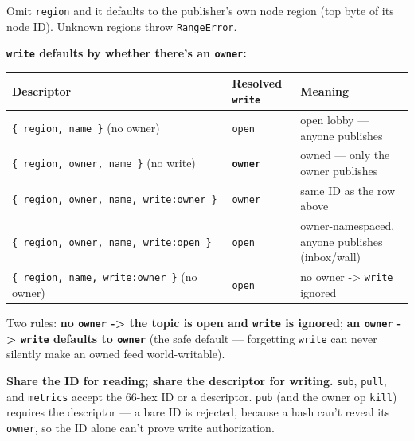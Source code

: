 \documentclass[
  nobib]{tufte-handout}
\newcounter{none} %
\begin{document}
Omit \texttt{region} and it defaults to the publisher's own node region
(top byte of its node ID). Unknown regions throw \texttt{RangeError}.

\textbf{\texttt{write} defaults by whether there's an \texttt{owner}:}

{\def\LTcaptype{none} %
\begin{longtable}[]{@{}
  >{\raggedright\arraybackslash}p{}
  >{\raggedright\arraybackslash}p{}
  >{\raggedright\arraybackslash}p{}@{}}
\toprule\noalign{}
\begin{minipage}[b]{\linewidth}\raggedright
Descriptor
\end{minipage} & \begin{minipage}[b]{\linewidth}\raggedright
Resolved \texttt{write}
\end{minipage} & \begin{minipage}[b]{\linewidth}\raggedright
Meaning
\end{minipage} \\
\midrule\noalign{}
\endhead
\bottomrule\noalign{}
\endlastfoot
\texttt{\{\ region,\ name\ \}} (no owner) & \texttt{open} & open lobby
--- anyone publishes \\
\texttt{\{\ region,\ owner,\ name\ \}} (no write) &
\textbf{\texttt{owner}} & owned --- only the owner publishes \\
\texttt{\{\ region,\ owner,\ name,\ write:\textquotesingle{}owner\textquotesingle{}\ \}}
& \texttt{owner} & same ID as the row above \\
\texttt{\{\ region,\ owner,\ name,\ write:\textquotesingle{}open\textquotesingle{}\ \}}
& \texttt{open} & owner-namespaced, anyone publishes (inbox/wall) \\
\texttt{\{\ region,\ name,\ write:\textquotesingle{}owner\textquotesingle{}\ \}}
(no owner) & \texttt{open} & no owner -\textgreater{} \texttt{write}
ignored \\
\end{longtable}
}

Two rules: \textbf{no \texttt{owner} -\textgreater{} the topic is open
and \texttt{write} is ignored}; \textbf{an \texttt{owner}
-\textgreater{} \texttt{write} defaults to
\texttt{\textquotesingle{}owner\textquotesingle{}}} (the safe default
--- forgetting \texttt{write} can never silently make an owned feed
world-writable).

\textbf{Share the ID for reading; share the descriptor for writing.}
\texttt{sub}, \texttt{pull}, and \texttt{metrics} accept the 66-hex ID
or a descriptor. \texttt{pub} (and the owner op \texttt{kill}) requires
the descriptor --- a bare ID is rejected, because a hash can't reveal
its \texttt{owner}, so the ID alone can't prove write authorization.
\end{document}
